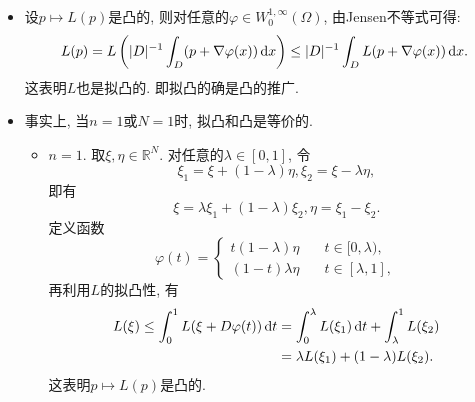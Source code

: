 \documentclass[12pt,a4paper]{article}
\begin{document}
\begin{itemize}
    \item 设$p \mapsto L(p)$是凸的, 则对任意的$\varphi \in W_0^{1, \infty}(\Omega)$, 由Jensen不等式可得: 
    \begin{align*}
        L(p) = L\left(|D|^{-1}\int_D(p + \nabla \varphi(x)) \,{\rm d}x\right) \leq |D|^{-1}\int_DL(p + \nabla\varphi(x)) \,{\rm d}x.
    \end{align*}
    这表明$L$也是拟凸的. 即拟凸的确是凸的推广.
    \item 事实上, 当$n = 1$或$N = 1$时, 拟凸和凸是等价的.
    \begin{itemize}
        \item $n = 1$. 取$\xi, \eta \in \mathbb{R}^N$. 对任意的$\lambda \in [0, 1]$, 令 
        \begin{equation*}
            \xi_1 = \xi + (1 - \lambda)\eta, \xi_2 = \xi - \lambda\eta,
        \end{equation*}
        即有 
        \begin{equation*}
            \xi = \lambda\xi_1 + (1 - \lambda)\xi_2, \eta = \xi_1 - \xi_2.
        \end{equation*}
        定义函数 
        \begin{equation*}
            \varphi(t) = 
            \begin{cases}
                t(1 - \lambda)\eta \quad &t \in [0, \lambda), \\ 
                (1 - t)\lambda\eta \quad &t \in [\lambda, 1],
            \end{cases}
        \end{equation*}
        再利用$L$的拟凸性, 有 
        \begin{align*}
            L(\xi) \leq \int_0^1L(\xi + D\varphi(t)) \,{\rm d}t &= \int_0^{\lambda}L(\xi_1) \,{\rm d}t + \int_{\lambda}^1L(\xi_2) \\
            &= \lambda L(\xi_1) + (1 - \lambda)L(\xi_2).
        \end{align*}
        这表明$p \mapsto L(p)$是凸的.
    \end{itemize}
\end{itemize}
\end{document}
